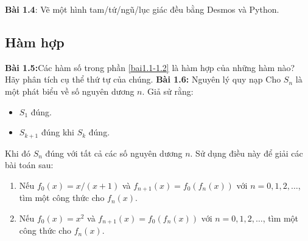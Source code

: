 \textbf{Bài 1.4}: Vẽ một hình tam/tứ/ngũ/lục giác đều bằng Desmos và Python.

\subsection*{Hàm hợp}
\textbf{Bài 1.5:}Các hàm số trong phần \ref{bai1.1-1.2} là hàm hợp của những hàm nào? Hãy phân tích cụ thể thứ tự của chúng.
\textbf{Bài 1.6\star:} Nguyên lý quy nạp\newline
Cho $S_n$ là một phát biểu về số nguyên dương $n$. Giả sử rằng:
\begin{itemize}
    \item $S_1$ đúng.
    \item $S_{k+1}$ đúng khi $S_k$ đúng.
\end{itemize}
Khi đó $S_n$ đúng với tất cả các số nguyên dương $n$.\newline
Sử dụng điều này để giải các bài toán sau:
\begin{enumerate}[label=(\alph*)]
\item Nếu $f_0(x) =x/(x+1)$ và $f_{n+1}(x)=f_0(f_n(x))$ với $n=0, 1, 2,\dots$, tìm một công thức cho $f_n(x)$.
\item Nếu $f_0(x) =x^2$ và $f_{n+1}(x)=f_0(f_n(x))$ với $n=0, 1, 2,\dots$, tìm một công thức cho $f_n(x)$.
\end{enumerate}




